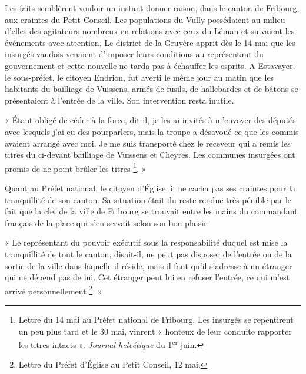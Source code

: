 \documentclass[french,twoside]{book} %
\newenvironment{quoteblock}%
  {\begin{quoting}}
  {\end{quoting}}
\newenvironment{quotebar}{%
    \def\FrameCommand{{\color{rubric!10!}\vrule width 0.5em} \hspace{0.9em}}%
    \def\OuterFrameSep{\itemsep} %
    \MakeFramed {\advance\hsize-\width \FrameRestore}
  }%
  {%
    \endMakeFramed
  }
\renewenvironment{quoteblock}%
  {%
    \savenotes
    \setstretch{0.9}
    \begin{quotebar}
  }
  {%
    \end{quotebar}
    \spewnotes
  }
\begin{document}
\noindent Les faits semblèrent vouloir un instant donner raison, dans le canton de Fribourg, aux craintes du Petit Conseil. Les populations du Vully possédaient au milieu d’elles des agitateurs nombreux en relations avec ceux du Léman et suivaient les événements avec attention. Le district de la Gruyère apprit dès le 14 mai que les insurgés vaudois venaient d’imposer leurs conditions au représentant du gouvernement et cette nouvelle ne tarda pas à échauffer les esprits. A Estavayer, le sous-préfet, le citoyen Endrion, fut averti le même jour au matin que les habitants du bailliage de Vuissens, armés de fusils, de hallebardes et de bâtons se présentaient à l’entrée de la ville. Son intervention resta inutile.\par

\begin{quoteblock}
 \noindent « Étant obligé de céder à la force, dit-il, je les ai invités à m’envoyer des députés avec lesquels j’ai eu des pourparlers, mais la troupe a désavoué ce que les commis avaient arrangé avec moi. Je me suis transporté chez le receveur qui a remis les titres du ci-devant bailliage de Vuissens et Cheyres. Les communes insurgées ont promis de ne point brûler les titres \footnote{Lettre du 14 mai au Préfet national de Fribourg. Les insurgés se repentirent un peu plus tard et le 30 mai, vinrent « honteux de leur conduite rapporter les titres intacts ». \emph{Journal helvétique} du 1\textsuperscript{er} juin.}. »
 \end{quoteblock}

\noindent Quant au Préfet national, le citoyen d’Église, il ne cacha pas ses craintes pour la tranquillité de son canton. Sa situation était du reste rendue très pénible par le fait que la clef de la ville de Fribourg se trouvait entre les mains du commandant français de la place qui s’en servait selon son bon plaisir.\par

\begin{quoteblock}
 \noindent « Le représentant du pouvoir exécutif sous la responsabilité duquel est mise la tranquillité de tout le canton, disait-il, ne peut pas disposer de l’entrée ou de la sortie de la ville dans laquelle il réside, mais il faut qu’il s’adresse à un étranger qui ne dépend pas de lui. Cet étranger peut lui en refuser l’entrée, ce qui m’est arrivé personnellement \footnote{Lettre du Préfet d’Église au Petit Conseil, 12 mai.}. »
 \end{quoteblock}
\end{document}
